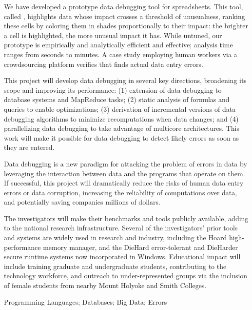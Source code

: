 We have developed a prototype data debugging tool
for spreadsheets. This tool, called
\checkcell{},
 highlights data whose impact crosses a threshold of unusualness,
ranking these cells by coloring them in shades proportionally to their
impact: the brighter a cell is highlighted, the more unusual impact it
has.  While untuned, our prototype is empirically and analytically
efficient and effective; analysis time ranges from seconds to minutes.
A case study employing human workers via a crowdsourcing platform
verifies that \checkcell{} finds actual data entry errors.

This project will develop data debugging in several key directions,
broadening its scope and improving its
performance: (1) extension of data debugging to database systems and
MapReduce tasks; (2) static analysis of formulas and queries to enable
optimizations; (3) derivation of incremental versions of data
debugging algorithms to minimize recomputations when data changes; and (4)
parallelizing data debugging to take advantage of multicore
architectures. This work will make it possible for data debugging to
detect likely errors as soon as they are entered.

\smallskip
{}
Data debugging is a new paradigm for attacking the problem of errors
in data by leveraging the interaction between data and the programs
that operate on them.  If successful, this project will dramatically
reduce the risks of human data entry errors or data corruption,
increasing the reliability of computations over data, and potentially
saving companies millions of dollars.

The investigators will make their benchmarks and tools publicly
available, adding to the national research infrastructure. Several of
the investigators' prior tools and systems are widely used in research
and industry, including the Hoard high-performance memory manager, and the
DieHard error-tolerant and DieHarder secure runtime systems now
incorporated in Windows. Educational impact will include training
graduate and undergraduate students, contributing to the technology
workforce, and outreach to under-represented groups via the inclusion
of female students from nearby Mount Holyoke and Smith Colleges.

\smallskip
{} Programming Languages; Databases; Big Data; Errors
